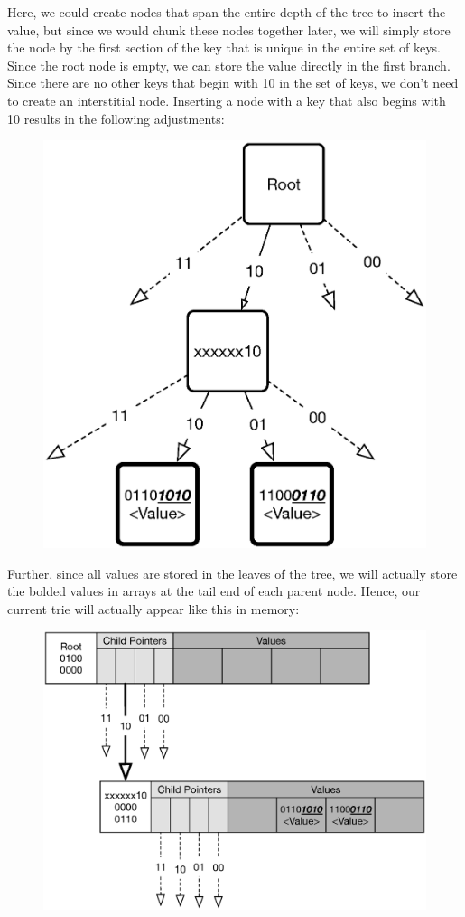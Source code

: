 \documentclass[preprint]{sigplanconf}
\begin{document}
Here, we could create nodes that span the entire depth of the tree to insert the value, but since we would chunk these nodes together later, we will simply store the node by the first section of the key that is unique in the entire set of keys.
Since the root node is empty, we can store the value directly in the first branch.
Since there are no other keys that begin with 10 in the set of keys, we don't need to create an interstitial node.
Inserting a node with a key that also begins with 10 results in the following adjustments:
\begin{figure}[H]
\includegraphics[scale=.5]{trie2}
\centering
\end{figure}
Further, since all values are stored in the leaves of the tree, we will actually store the bolded values in arrays at the tail end of each parent node. Hence, our current trie will actually appear like this in memory:
\begin{figure}[H]
\includegraphics[scale=.4]{trie2actual}
\centering
\end{figure}
\end{document}
